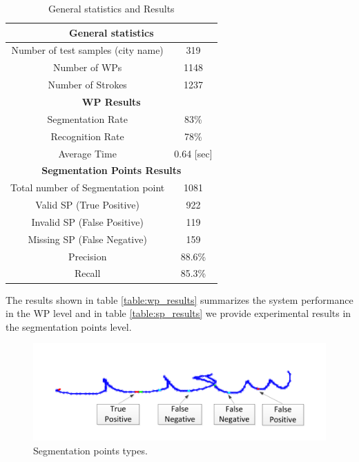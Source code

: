 \documentclass[10pt, conference, compsocconf]{IEEEtran}
\begin{document}
\begin{table}[h]
\caption{General statistics and Results}
\begin{tabular}{ | c | c | }
  \hline
  \multicolumn{2}{|c|}{\textbf{General statistics}}\\
  \hline
  Number of test samples (city name) & 319 \\
  \hline
  Number of WPs & 1148 \\
  \hline
  Number of Strokes & 1237 \\
  \hline
  \hline
  \multicolumn{2}{|c|}{\textbf{WP Results}}\\
  \hline
   Segmentation Rate &  83\% \\ 
  \hline
  Recognition Rate &  78\% \\ 
  \hline
  Average Time & 0.64 [sec] \\
  \hline
  \hline
  \multicolumn{2}{|c|}{\textbf{Segmentation Points Results}}\\
  \hline
  Total number of Segmentation point & 1081 \\
  \hline
  Valid SP (True Positive) & 922 \\
  \hline
  Invalid SP (False Positive) & 119 \\
  \hline
  Missing SP (False Negative) & 159 \\
  \hline                                    
  Precision & 88.6\% \\ 
 \hline
  Recall &  85.3\% \\ 
 \hline
\end{tabular}
\centering
\label{table:general_stats} 
\end{table}

The results shown in table \ref{table:wp_results} summarizes the system performance in the WP level and in table \ref{table:sp_results} we provide experimental results in the segmentation points level. \\

\begin{figure}
\centering
\includegraphics[width=0.9\columnwidth]{./figures/sp_types}
\caption{Segmentation points types.}
\label{fig:sp_types}
\end{figure}
\end{document}
